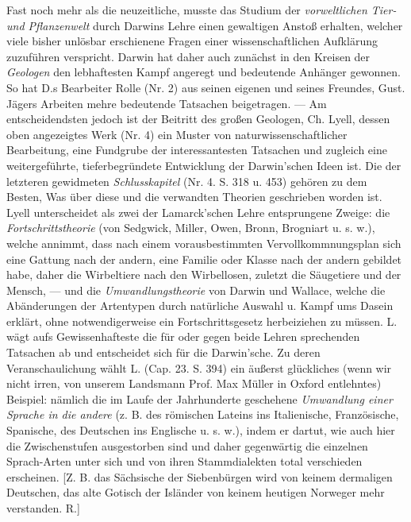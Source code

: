 \documentclass[a4paper, 11pt, oneside, english]{article}
\begin{document}
Fast noch mehr als die neuzeitliche, musste das Studium der \emph{vorweltlichen Tier- und Pflanzenwelt} durch Darwins Lehre einen gewaltigen Anstoß erhalten, welcher viele bisher unlösbar erschienene Fragen einer wissenschaftlichen Aufklärung zuzuführen verspricht. Darwin hat daher auch zunächst in den Kreisen der \emph{Geologen} den lebhaftesten Kampf angeregt und bedeutende Anhänger gewonnen. So hat D.s Bearbeiter Rolle (Nr. 2) aus seinen eigenen und seines Freundes, Gust. Jägers Arbeiten mehre bedeutende Tatsachen beigetragen. --- Am entscheidendsten jedoch ist der Beitritt des großen Geologen, Ch. Lyell, dessen oben angezeigtes Werk (Nr. 4) ein Muster von naturwissenschaftlicher Bearbeitung, eine Fundgrube der interessantesten Tatsachen und zugleich eine weitergeführte, tieferbegründete Entwicklung der Darwin'schen Ideen ist. Die der letzteren gewidmeten \emph{Schlusskapitel} (Nr. 4. S. 318 u. 453) gehören zu dem Besten, Was über diese und die verwandten Theorien geschrieben worden ist. Lyell unterscheidet als zwei der Lamarck'schen Lehre entsprungene Zweige: die \emph{Fortschrittstheorie} (von Sedgwick, Miller, Owen, Bronn, Brogniart u. s. w.), welche annimmt, dass nach einem vorausbestimmten Vervollkommnungsplan sich eine Gattung nach der andern, eine Familie oder Klasse nach der andern gebildet habe, daher die Wirbeltiere nach den Wirbellosen, zuletzt die Säugetiere und der Mensch, --- und die \emph{Umwandlungstheorie} von Darwin und Wallace, welche die Abänderungen der Artentypen durch natürliche Auswahl u. Kampf ums Dasein erklärt, ohne notwendigerweise ein Fortschrittsgesetz herbeiziehen zu müssen. L. wägt aufs Gewissenhafteste die für oder gegen beide Lehren sprechenden Tatsachen ab und entscheidet sich für die Darwin'sche. Zu deren Veranschaulichung wählt L. (Cap. 23. S. 394) ein äußerst glückliches (wenn wir nicht irren, von unserem Landsmann Prof. Max Müller in Oxford entlehntes) Beispiel: nämlich die im Laufe der Jahrhunderte geschehene \emph{Umwandlung einer Sprache in die andere} (z. B. des römischen Lateins ins Italienische, Französische, Spanische, des Deutschen ins Englische u. s. w.), indem er dartut, wie auch hier die Zwischenstufen ausgestorben sind und daher gegenwärtig die einzelnen Sprach-Arten unter sich und von ihren Stammdialekten total verschieden erscheinen. [Z. B. das Sächsische der Siebenbürgen wird von keinem dermaligen Deutschen, das alte Gotisch der Isländer von keinem heutigen Norweger mehr verstanden. R.]
\end{document}
